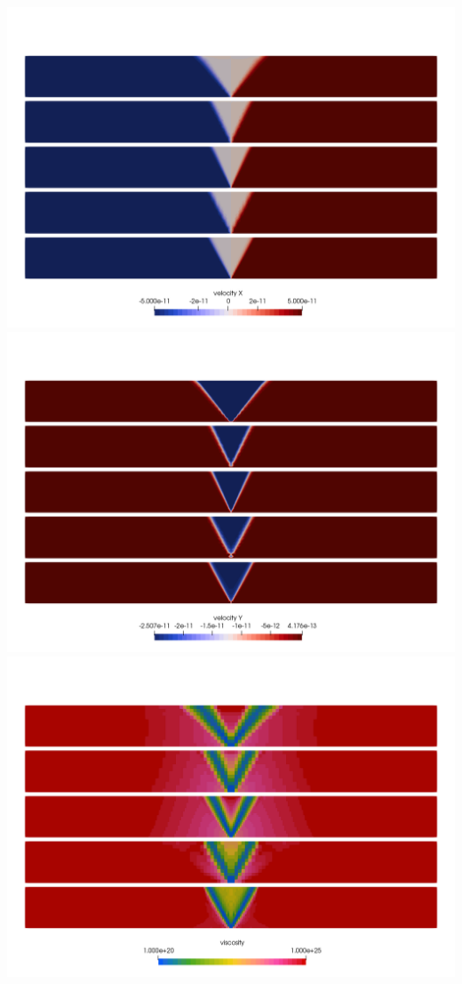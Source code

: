 \begin{center}
\includegraphics[width=.8\linewidth]{python_codes/fieldstone_39/images/extension_u}\\
\includegraphics[width=.8\linewidth]{python_codes/fieldstone_39/images/extension_v}\\
\includegraphics[width=.8\linewidth]{python_codes/fieldstone_39/images/extension_mueff}\\

\end{center}
